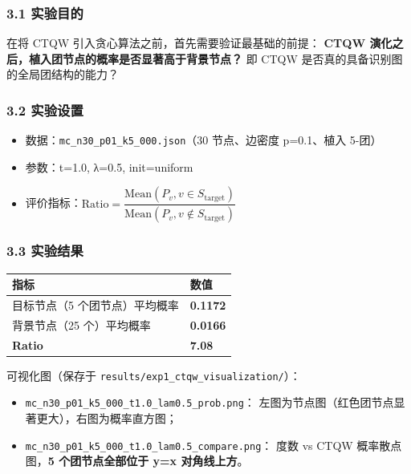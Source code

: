 \documentclass[
  11pt,
]{ctexart}
\newcounter{none} %
\providecommand{\tightlist}{%
  \setlength{\itemsep}{0pt}\setlength{\parskip}{0pt}}
\begin{document}
\subsubsection{3.1 实验目的}\label{ux5b9eux9a8cux76eeux7684}

在将 CTQW 引入贪心算法之前，首先需要验证最基础的前提： \textbf{CTQW
演化之后，植入团节点的概率是否显著高于背景节点？} 即 CTQW
是否真的具备识别图的全局团结构的能力？

\subsubsection{3.2 实验设置}\label{ux5b9eux9a8cux8bbeux7f6e}

\begin{itemize}
\tightlist
\item
  数据：\texttt{mc\_n30\_p01\_k5\_000.json}（30 节点、边密度 p=0.1、植入
  5-团）
\item
  参数：t=1.0, λ=0.5, init=uniform
\item
  评价指标：\(\text{Ratio} = \dfrac{\text{Mean}(P_v, v \in S_{\text{target}})}{\text{Mean}(P_v, v \notin S_{\text{target}})}\)
\end{itemize}

\subsubsection{3.3 实验结果}\label{ux5b9eux9a8cux7ed3ux679c}

{\def\LTcaptype{none} %
\begin{longtable}[]{@{}ll@{}}
\toprule\noalign{}
指标 & 数值 \\
\midrule\noalign{}
\endhead
\bottomrule\noalign{}
\endlastfoot
目标节点（5 个团节点）平均概率 & \textbf{0.1172} \\
背景节点（25 个）平均概率 & \textbf{0.0166} \\
\textbf{Ratio} & \textbf{7.08} \\
\end{longtable}
}

可视化图（保存于 \texttt{results/exp1\_ctqw\_visualization/}）：

\begin{itemize}
\tightlist
\item
  \texttt{mc\_n30\_p01\_k5\_000\_t1.0\_lam0.5\_prob.png}：
  左图为节点图（红色团节点显著更大），右图为概率直方图；
\item
  \texttt{mc\_n30\_p01\_k5\_000\_t1.0\_lam0.5\_compare.png}： 度数 vs
  CTQW 概率散点图，\textbf{5 个团节点全部位于 y=x 对角线上方}。
\end{itemize}
\end{document}
